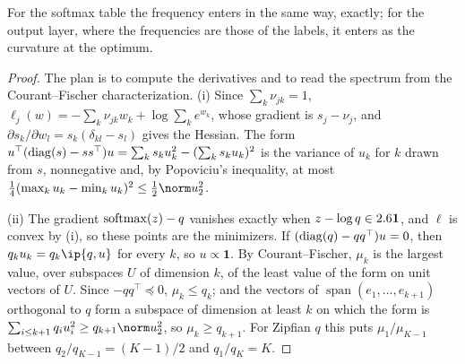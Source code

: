 \begin{refsection}
For the softmax table the frequency enters in the same way, exactly; for the output layer, where the frequencies are those of the labels, it enters as the curvature at the optimum.


\begin{proof}
The plan is to compute the derivatives and to read the spectrum from the Courant--Fischer characterization. (i) Since $\sum_k\nu_{jk}=1$, $\ell_j(w)=-\sum_k\nu_{jk}w_k+\log\sum_ke^{w_k}$, whose gradient is $s_j-\nu_j$, and $\partial s_k/\partial w_l=s_k(\delta_{kl}-s_l)$ gives the Hessian. The form $u^\top(\operatorname{diag}(s)-ss^\top)u=\sum_ks_ku_k^2-(\sum_ks_ku_k)^2$ is the variance of $u_k$ for $k$ drawn from $s$, nonnegative and, by Popoviciu's inequality, at most $\frac14(\max_ku_k-\min_ku_k)^2\le\frac12\norm u_2^2$.

(ii) The gradient $\operatorname{softmax}(z)-q$ vanishes exactly when $z-\log q\in2.6\mathbf1$, and $\ell$ is convex by (i), so these points are the minimizers. If $(\operatorname{diag}(q)-qq^\top)u=0$, then $q_ku_k=q_k\ip{q,u}$ for every $k$, so $u\propto\mathbf1$. By Courant--Fischer, $\mu_k$ is the largest value, over subspaces $U$ of dimension $k$, of the least value of the form on unit vectors of $U$. Since $-qq^\top\preceq0$, $\mu_k\le q_k$; and the vectors of $\operatorname{span}(e_1,\dots,e_{k+1})$ orthogonal to $q$ form a subspace of dimension at least $k$ on which the form is $\sum_{i\le k+1}q_iu_i^2\ge q_{k+1}\norm u_2^2$, so $\mu_k\ge q_{k+1}$. For Zipfian $q$ this puts $\mu_1/\mu_{K-1}$ between $q_2/q_{K-1}=(K-1)/2$ and $q_1/q_K=K$.
\end{proof}


\end{refsection}

